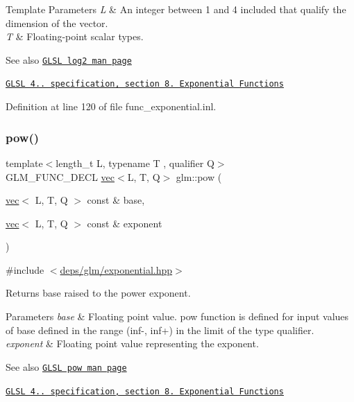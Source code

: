 \begin{DoxyTemplParams}{Template Parameters}
{\em L} & An integer between 1 and 4 included that qualify the dimension of the vector. \\
\hline
{\em T} & Floating-\/point scalar types.\\
\hline
\end{DoxyTemplParams}
\begin{DoxySeeAlso}{See also}
\href{http://www.opengl.org/sdk/docs/manglsl/xhtml/log2.xml}{\tt G\+L\+SL log2 man page} 

\href{http://www.opengl.org/registry/doc/GLSLangSpec.4.20.8.pdf}{\tt G\+L\+SL 4.. specification, section 8. Exponential Functions} 
\end{DoxySeeAlso}


Definition at line 120 of file func\+\_\+exponential.\+inl.

\mbox{\label{group__core__func__exponential_ga2254981952d4f333b900a6bf5167a6c4}} 
\subsubsection{\texorpdfstring{pow()}{pow()}}
{\footnotesize\ttfamily template$<$length\+\_\+t L, typename T , qualifier Q$>$ \\
G\+L\+M\+\_\+\+F\+U\+N\+C\+\_\+\+D\+E\+CL \hyperlink{structglm_1_1vec}{vec}$<$L, T, Q$>$ glm\+::pow (\begin{DoxyParamCaption}\item[{\hyperlink{structglm_1_1vec}{vec}$<$ L, T, Q $>$ const \&}]{base,  }\item[{\hyperlink{structglm_1_1vec}{vec}$<$ L, T, Q $>$ const \&}]{exponent }\end{DoxyParamCaption})}



{\ttfamily \#include $<$\hyperlink{exponential_8hpp}{deps/glm/exponential.\+hpp}$>$}

Returns \textquotesingle{}base\textquotesingle{} raised to the power \textquotesingle{}exponent\textquotesingle{}.


\begin{DoxyParams}{Parameters}
{\em base} & Floating point value. pow function is defined for input values of \textquotesingle{}base\textquotesingle{} defined in the range (inf-\/, inf+) in the limit of the type qualifier. \\
\hline
{\em exponent} & Floating point value representing the \textquotesingle{}exponent\textquotesingle{}.\\
\hline
\end{DoxyParams}
\begin{DoxySeeAlso}{See also}
\href{http://www.opengl.org/sdk/docs/manglsl/xhtml/pow.xml}{\tt G\+L\+SL pow man page} 

\href{http://www.opengl.org/registry/doc/GLSLangSpec.4.20.8.pdf}{\tt G\+L\+SL 4.. specification, section 8. Exponential Functions} 
\end{DoxySeeAlso}


